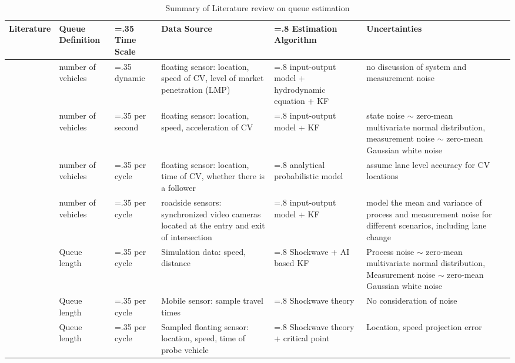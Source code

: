 \newpage
\begin{landscape}
\begin{table}
\centering
\footnotesize 
\caption{Summary of Literature review on queue estimation \uppercase\expandafter{}}
\label{LR2}
\begin{tabularx}{\linewidth}{@{} l 
>{\hsize=0.6\hsize}X  %
>{\hsize=.35\hsize}X  %
>{\hsize=1.2\hsize}X  %
>{\hsize=.8\hsize}X %
>{\hsize=1.3\hsize}X %
>{\hsize=1\hsize}X %
@{}} 
\toprule
\textbf{Literature} & \textbf{Queue Definition} & \textbf{Time Scale} & \textbf{Data Source} & \textbf{Estimation Algorithm} & \textbf{Uncertainties} \\
\midrule
\textcite{aljamal2020real} & number of vehicles & dynamic & floating sensor: location, speed of CV, level of market penetration (LMP) & input-output model + hydrodynamic equation + KF & no discussion of system and measurement noise \\
\textcite{wang2021kalman} & number of vehicles & per second & floating sensor: location, speed, acceleration of CV & input-output model + KF & state noise $\sim$ zero-mean multivariate normal distribution, measurement noise $\sim$ zero-mean Gaussian white noise \\
\textcite{comert2021queue} & number of vehicles & per cycle & floating sensor: location, time of CV, whether there is a follower & analytical probabilistic model & assume lane level accuracy for CV locations \\
\textcite{anusha2022dynamical} & number of vehicles & per cycle & roadside sensors: synchronized video cameras located at the entry and exit of intersection & input-output model + KF & model the mean and variance of process and measurement noise for different scenarios, including lane change \\
\textcite{ferencz2023road} & Queue length & per cycle & Simulation data: speed, distance & Shockwave + AI based KF & Process noise $\sim$ zero-mean multivariate normal distribution, Measurement noise $\sim$ zero-mean Gaussian white noise \\
\textcite{ban2011real} & Queue length & per cycle & Mobile sensor: sample travel times & Shockwave theory & No consideration of noise \\
\textcite{cheng2011cycle} & Queue length & per cycle & Sampled floating sensor: location, speed, time of probe vehicle & Shockwave theory + critical point & Location, speed projection error \\

\end{tabularx}
\end{table}
\end{landscape}
